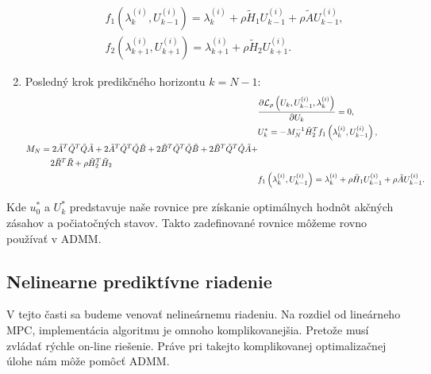\begin{enumerate}
{\begin{subequations}
\begin{align}
\begin{split}
				\end{split}\\
				& f_{1}\left(\lambda_{k}^{(i)},U_{k-1}^{(i)}\right) = \lambda_{k}^{(i)} + \rho\tilde{H}_{1}U_{k-1}^{(i)}+\rho\tilde{A}U_{k-1}^{(i)},\\
				& f_{2}\left(\lambda_{k+1}^{(i)},U_{k+1}^{(i)}\right) = \lambda_{k+1}^{(i)} + \rho\tilde{H}_{2}U_{k+1}^{(i)}.
			\end{align}
		\end{subequations}
	}
		\item{Posledný krok predikčného horizontu $k = N-1$:\\
		\begin{subequations}
			\begin{align}
			&\frac{\partial \mathcal{L}_{\rho}\left(U_{k},U_{k-1}^{(i)},\lambda_{k}^{(i)}\right)}{\partial U_{k}} = 0,\\
			&U_{k}^{*} = -M_{N}^{-1}\tilde{H}_{2}^{T}f_{1}\left(\lambda_{k}^{(i)},U_{k-1}^{(i)}\right),\\
			\begin{split}
			& M_{N} = 2\tilde{A}^{T}\tilde{Q}^{T}\tilde{Q}\tilde{A}+2\tilde{A}^{T}\tilde{Q}^{T}\tilde{Q}\tilde{B}+2\tilde{B}^{T}\tilde{Q}^{T}\tilde{Q}\tilde{B}+2\tilde{B}^{T}\tilde{Q}^{T}\hat{Q}\tilde{A}+\\
			&\hspace{1.0cm}2\tilde{R}^{T}\tilde{R} + \rho\tilde{H}_{2}^{T}\tilde{H}_{2}
			\end{split}\\
			& f_{1}\left(\lambda_{k}^{(i)},U_{k-1}^{(i)}\right) = \lambda_{k}^{(i)} + \rho\tilde{H}_{1}U_{k-1}^{(i)}+\rho\tilde{A}U_{k-1}^{(i)}.
			\end{align}
		\end{subequations}
	}
\end{enumerate}
Kde $u_{0}^{*}$ a $U_{k}^{*}$ predstavuje naše rovnice pre získanie optimálnych hodnôt akčných zásahov a počiatočných stavov. Takto zadefinované rovnice môžeme rovno používať v ADMM.

\subsection{Nelinearne prediktívne riadenie}
\label{subse:Nelin_MPC_ADMM}
V tejto časti sa budeme venovať nelineárnemu riadeniu. Na rozdiel od lineárneho MPC, implementácia algoritmu je omnoho komplikovanejšia. Pretože musí zvládať rýchle on-line riešenie. Práve pri takejto komplikovanej optimalizačnej úlohe nám môže pomôcť ADMM.

